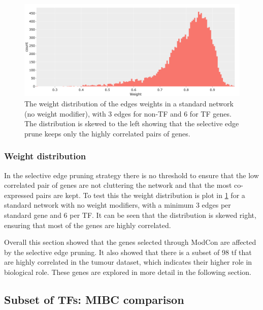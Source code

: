 \begin{figure}[!t]   
\centering
\includegraphics[width=1.0\textwidth,height=1.0\textheight,keepaspectratio]{Sections/Network_I/Resources/selective_pruning/weight_distrib.png}
  \caption{The weight distribution of the edges weights in a standard network (no weight modifier), with 3 edges for non-TF and 6 for TF genes. The distribution is skewed to the left showing that the selective edge prune keeps only the highly correlated pairs of genes.}
\label{fig:N_I:weight_distrib}
\end{figure}

\subsubsection*{Weight distribution}

In the selective edge pruning strategy there is no threshold to ensure that the low correlated pair of genes are not cluttering the network and that the most co-expressed pairs are kept. To test this the weight distribution is plot in \cref{fig:N_I:weight_distrib} for a standard network with no weight modifiers, with a minimum 3 edges per standard gene and 6 per TF. It can be seen that the distribution is skewed right, ensuring that most of the genes are highly correlated.


Overall this section showed that the genes selected through ModCon are affected by the selective edge pruning. It also showed that there is a subset of 98 \acrlong{tf} that are highly correlated in the tumour dataset, which indicates their higher role in biological role. These genes are explored in more detail in the following section.


\subsection{Subset of TFs: MIBC comparison} \label{s:N_I:sel_tfs_mibc}

